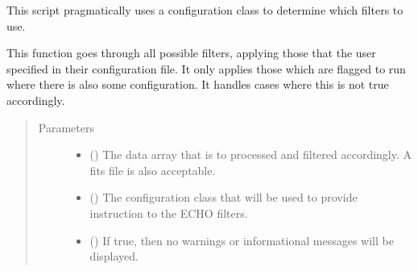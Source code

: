 \documentclass[letterpaper,10pt,english]{sphinxmanual}
\begin{document}

\begin{fulllineitems}
\label{\detokenize{python_docstrings/IfA_Smeargle.echo.echo_main:IfA_Smeargle.echo.echo_main.echo_execution}}
This script pragmatically uses a configuration class to determine
which filters to use.

This function goes through all possible filters, applying those that the
user specified in their configuration file. It only applies those which
are flagged to run where there is also some configuration. It handles
cases where this is not true accordingly.
\begin{quote}\begin{description}
\item[{Parameters}] \leavevmode\begin{itemize}
\item {} 
 () \textendash{} The data array that is to processed and filtered accordingly. A fits
file is also acceptable.

\item {} 
 ({\hyperref[\detokenize{python_docstrings/IfA_Smeargle.yankee.yankee_main:IfA_Smeargle.yankee.yankee_main.SmeargleConfig}]{}}) \textendash{} The configuration class that will be used to provide instruction
to the ECHO filters.

\item {} 
 (\sphinxstyleliteralemphasis{\sphinxupquote{ (}}\sphinxstyleliteralemphasis{\sphinxupquote{)}}) \textendash{} If true, then no warnings or informational messages will be displayed.


\end{itemize}
\end{description}
\end{quote}
\end{fulllineitems}
\end{document}
